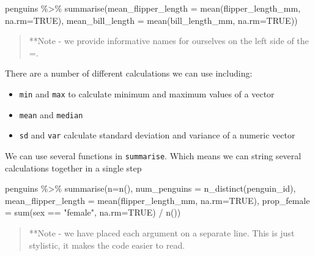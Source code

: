 \documentclass[
]{book}
\newenvironment{Shaded}{\begin{snugshade}}{\end{snugshade}}
\newcommand{\AttributeTok}[1]{\textcolor[rgb]{0.77,0.63,0.00}{#1}}
\newcommand{\ConstantTok}[1]{\textcolor[rgb]{0.00,0.00,0.00}{#1}}
\newcommand{\FunctionTok}[1]{\textcolor[rgb]{0.00,0.00,0.00}{#1}}
\newcommand{\NormalTok}[1]{#1}
\newcommand{\SpecialCharTok}[1]{\textcolor[rgb]{0.00,0.00,0.00}{#1}}
\newcommand{\StringTok}[1]{\textcolor[rgb]{0.31,0.60,0.02}{#1}}
\begin{document}
\begin{Shaded}
\begin{Highlighting}[]
\NormalTok{penguins }\SpecialCharTok{\%\textgreater{}\%} 
  \FunctionTok{summarise}\NormalTok{(}\AttributeTok{mean\_flipper\_length =} \FunctionTok{mean}\NormalTok{(flipper\_length\_mm, }\AttributeTok{na.rm=}\ConstantTok{TRUE}\NormalTok{),}
   \AttributeTok{mean\_bill\_length =} \FunctionTok{mean}\NormalTok{(bill\_length\_mm, }\AttributeTok{na.rm=}\ConstantTok{TRUE}\NormalTok{))}
\end{Highlighting}
\end{Shaded}

\begin{quote}
**Note - we provide informative names for ourselves on the left side of the =.
\end{quote}

There are a number of different calculations we can use including:

\begin{itemize}
\item
  \texttt{min} and \texttt{max} to calculate minimum and maximum values of a vector
\item
  \texttt{mean} and \texttt{median}
\item
  \texttt{sd} and \texttt{var} calculate standard deviation and variance of a numeric vector
\end{itemize}

We can use several functions in \texttt{summarise}. Which means we can string several calculations together in a single step

\begin{Shaded}
\begin{Highlighting}[]
\NormalTok{penguins }\SpecialCharTok{\%\textgreater{}\%} 
  \FunctionTok{summarise}\NormalTok{(}\AttributeTok{n=}\FunctionTok{n}\NormalTok{(),}
            \AttributeTok{num\_penguins =} \FunctionTok{n\_distinct}\NormalTok{(penguin\_id),}
            \AttributeTok{mean\_flipper\_length =} \FunctionTok{mean}\NormalTok{(flipper\_length\_mm, }\AttributeTok{na.rm=}\ConstantTok{TRUE}\NormalTok{),}
            \AttributeTok{prop\_female =} \FunctionTok{sum}\NormalTok{(sex }\SpecialCharTok{==} \StringTok{"female"}\NormalTok{, }\AttributeTok{na.rm=}\ConstantTok{TRUE}\NormalTok{) }\SpecialCharTok{/} \FunctionTok{n}\NormalTok{())}
\end{Highlighting}
\end{Shaded}

\begin{quote}
**Note - we have placed each argument on a separate line. This is just stylistic, it makes the code easier to read.
\end{quote}
\end{document}
